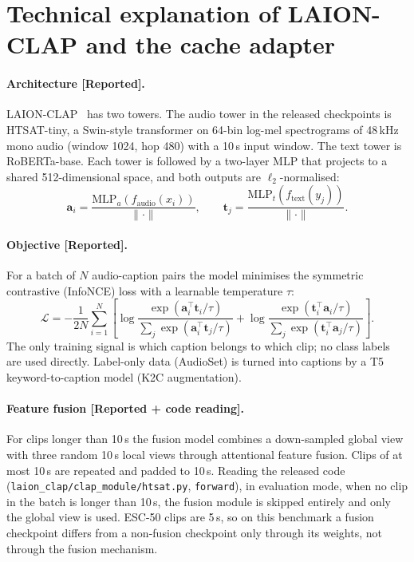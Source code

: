 \section{Technical explanation of LAION-CLAP and the cache adapter}
\label{sec:method}

\paragraph{Architecture [Reported].}
LAION-CLAP~\cite{wu2023laionclap} has two towers. The audio tower in the released checkpoints is HTSAT-tiny, a Swin-style transformer on
64-bin log-mel spectrograms of 48\,kHz mono audio (window 1024, hop 480) with a 10\,s input window. The text tower is RoBERTa-base.
Each tower is followed by a two-layer MLP that projects to a shared 512-dimensional space, and both outputs are $\ell_2$-normalised:
\[
  \mathbf{a}_i = \frac{\mathrm{MLP}_a(f_{\text{audio}}(x_i))}{\lVert\cdot\rVert}, \qquad
  \mathbf{t}_j = \frac{\mathrm{MLP}_t(f_{\text{text}}(y_j))}{\lVert\cdot\rVert}.
\]

\paragraph{Objective [Reported].}
For a batch of $N$ audio-caption pairs the model minimises the symmetric contrastive (InfoNCE) loss with a learnable temperature $\tau$:
\[
  \mathcal{L} = -\frac{1}{2N}\sum_{i=1}^{N}\left[
  \log\frac{\exp(\mathbf{a}_i^\top\mathbf{t}_i/\tau)}{\sum_{j}\exp(\mathbf{a}_i^\top\mathbf{t}_j/\tau)} +
  \log\frac{\exp(\mathbf{t}_i^\top\mathbf{a}_i/\tau)}{\sum_{j}\exp(\mathbf{t}_i^\top\mathbf{a}_j/\tau)}\right].
\]
The only training signal is which caption belongs to which clip; no class labels are used directly.
Label-only data (AudioSet) is turned into captions by a T5 keyword-to-caption model (K2C augmentation).

\paragraph{Feature fusion [Reported + code reading].}
For clips longer than 10\,s the fusion model combines a down-sampled global view with three random 10\,s local views through attentional feature fusion.
Clips of at most 10\,s are repeated and padded to 10\,s. Reading the released code (\texttt{laion\_clap/clap\_module/htsat.py}, \texttt{forward}),
in evaluation mode, when no clip in the batch is longer than 10\,s, the fusion module is skipped entirely and only the global view is used.
ESC-50 clips are 5\,s, so on this benchmark a fusion checkpoint differs from a non-fusion checkpoint only through its weights, not through the fusion mechanism.

